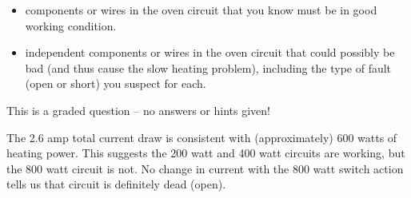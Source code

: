 \begin{itemize}
\item{}  components or wires in the oven circuit that you know must be in good working condition.
\vskip 40pt
\item{}  independent components or wires in the oven circuit that could possibly be bad (and thus cause the slow heating problem), including the type of fault (open or short) you suspect for each.
\end{itemize}

\vfil 

\eject






This is a graded question -- no answers or hints given!







The 2.6 amp total current draw is consistent with (approximately) 600 watts of heating power.  This suggests the 200 watt and 400 watt circuits are working, but the 800 watt circuit is not.  No change in current with the 800 watt switch action tells us that circuit is definitely dead (open).





